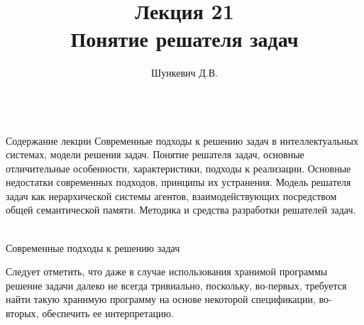 \title{Лекция 21\\Понятие решателя задач}
\author[]{Шункевич Д.В.}

\begin{frame}
	\titlepage
\end{frame}

\begin{frame}{\\Содержание лекции}
	\topline
	\justifying
	Современные подходы к решению задач в интеллектуальных системах, модели решения задач. Понятие решателя задач, основные отличительные особенности, характеристики, подходы к реализации. Основные недостатки современных подходов, принципы их устранения. Модель решателя задач как иерархической системы агентов, взаимодействующих посредством общей семантической памяти. Методика и средства разработки решателей задач.
\end{frame}

\begin{frame}{\\Современные подходы к решению задач}
	\topline
	\justifying
	\vspace*{\fill}\\
	\footnotesize{
		\begin{SCn}
		\end{SCn}
		Следует отметить, что даже в случае использования хранимой программы решение задачи далеко не всегда тривиально, поскольку, во-первых, требуется найти такую хранимую программу на основе некоторой спецификации, во-вторых, обеспечить ее интерпретацию.
	}
	
\end{frame}

